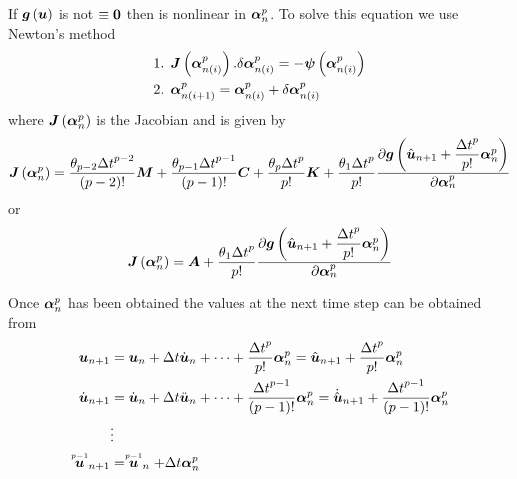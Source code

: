 If $ \boldsymbol{g}\left( \boldsymbol{u} \right) $ is not $\equiv\boldsymbol{0}$ then
 is nonlinear in $\boldsymbol{\alpha}^{p}_{n}$. To solve this
equation we use Newton's method \ie
\begin{equation}
  \begin{split}
    \text{1.  } & \fnof{\matr{J}}{\vectr{\alpha}^{p}_{n(i)}}.\delta
    \vectr{\alpha}^{p}_{n(i)} = 
    -\fnof{\vectr{\psi}}{\vectr{\alpha}^{p}_{n(i)}} \\
    \text{2.  } & \vectr{\alpha}^{p}_{n(i+1)}=\vectr{\alpha}^{p}_{n(i)}+\delta
    \vectr{\alpha}^{p}_{n(i)}
  \end{split}
\end{equation}
where $\fnof{\matr{J}}{\vectr{\alpha}^{p}_{n}}$ is the Jacobian and is given by
\begin{equation}
  \fnof{\matr{J}}{\vectr{\alpha}^{p}_{n}}=\dfrac{\theta_{p-2}{\Delta t}^{p-2}}{\factorial{p-2}}\matr{M}+
  \dfrac{\theta_{p-1}{\Delta
      t}^{p-1}}{\factorial{p-1}}\matr{C}+\dfrac{\theta_{p}{\Delta t}^{p}}{p!}\matr{K}+
  \dfrac{\theta_{1}{\Delta t}^{p}}{p!}
  \delby{\fnof{\vectr{g}}{\hat{\vectr{u}}_{n+1}+\dfrac{{\Delta
          t}^{p}}{p!}
      \vectr{\alpha}^{p}_{n}}}{\vectr{\alpha}^{p}_{n}}
\end{equation}
or
\begin{equation}
  \fnof{\matr{J}}{\vectr{\alpha}^{p}_{n}}=\matr{A}+\dfrac{\theta_{1}{\Delta
      t}^{p}}{p!}
  \delby{\fnof{\vectr{g}}{\hat{\vectr{u}}_{n+1}+\dfrac{{\Delta t}^{p}}{p!}\vectr{\alpha}^{p}_{n}}}{\vectr{\alpha}^{p}_{n}}
\end{equation}

Once $\boldsymbol{\alpha}^{p}_{n}$ has been obtained the values at the next time step can be obtained from
\begin{equation}
  \begin{split}
    \boldsymbol{u}_{n+1} &= \boldsymbol{u}_{n}+\Delta t
    \dot{\boldsymbol{u}}_{n}+\cdots+\dfrac{{\Delta
        t}^{p}}{p!}\boldsymbol{\alpha}^{p}_{n}=\hat{\boldsymbol{u}}_{n+1}+
    \dfrac{{\Delta t}^{p}}{p!}\boldsymbol{\alpha}^{p}_{n}\\
    \dot{\boldsymbol{u}}_{n+1} &= \dot{\boldsymbol{u}}_{n}+\Delta t
    \ddot{\boldsymbol{u}}_{n}+\cdots+\dfrac{{\Delta
        t}^{p-1}}{\left( p-1 \right)!}\boldsymbol{\alpha}^{p}_{n}=\dot{\hat{\boldsymbol{u}}}_{n+1}+\dfrac{{\Delta
        t}^{p-1}}{\left( p-1 \right)!}\boldsymbol{\alpha}^{p}_{n} \\
    &\vdots \\
     \stackrel{\scriptscriptstyle p-1}{\boldsymbol{u}} _{n+1} &=  \stackrel{\scriptscriptstyle p-1}{\boldsymbol{u}} _{n}+\Delta t\boldsymbol{\alpha}^{p}_{n}
  \end{split}
\end{equation}

